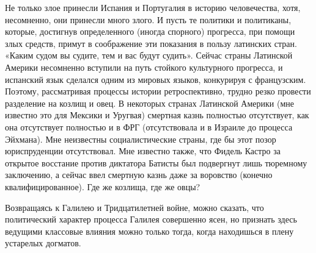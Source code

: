 Не только злое принесли Испания и Португалия в историю человечества, хотя,
несомненно, они принесли много злого. И пусть те политики и политиканы,
которые, достигнув определенного (иногда спорного) прогресса, при помощи злых
средств, примут в соображение эти показания в пользу латинских стран. «Каким
судом вы судите, тем и вас будут судить». Сейчас страны Латинской Америки
несомненно вступили на путь стойкого культурного прогресса, и испанский язык
сделался одним из мировых языков, конкурируя с французским. Поэтому,
рассматривая процессы истории ретроспективно, трудно резко провести разделение
на козлищ и овец. В некоторых странах Латинской Америки (мне известно это для
Мексики и Уругвая) смертная казнь полностью отсутствует, как она отсутствует
полностью и в ФРГ (отсутствовала и в Израиле до процесса Эйхмана). Мне
неизвестны социалистические страны, где бы этот позор юриспруденции
отсутствовал. Мне известно также, что Фидель Кастро за открытое восстание
против диктатора Батисты был подвергнут лишь тюремному заключению, а сейчас
ввел смертную казнь даже за воровство (конечно квалифицированное). Где же
козлища, где же овцы?

Возвращаясь к Галилею и Тридцатилетней войне, можно сказать, что политический
характер процесса Галилея совершенно ясен, но признать здесь ведущими классовые
влияния можно только тогда, когда находишься в плену устарелых догматов.

